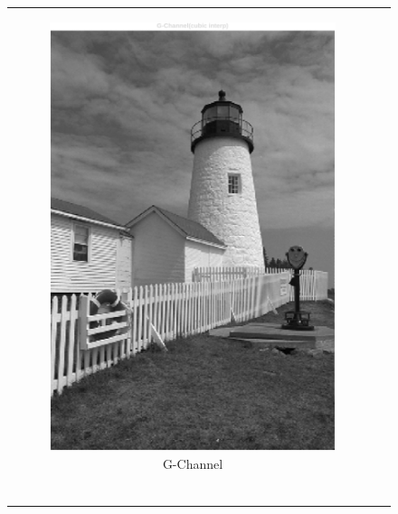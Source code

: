 \documentclass[11pt, a4]{article}
\begin{document}
\begin{enumerate}
\begin{enumerate}
\begin{figure}[H]
{\begin{tabular}{cc}
\begin{subfigure}[h]{0.45\linewidth}
						\includegraphics[width=\linewidth]{../output/2_G-channel_cubic.pdf}
						\caption{G-Channel}
						\label{fig:problem_part21_G_cubic}
					\end{subfigure}\\
					\begin{subfigure}[h]{0.45\linewidth}
						\centering

\end{subfigure}
\end{tabular}}
\end{figure}
\end{enumerate}
\end{enumerate}
\end{document}
